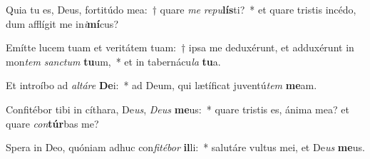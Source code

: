 \item Quia tu es, Deus, fortitúdo mea:~† quare \textit{me} \textit{re}\textit{pu}\textbf{lís}ti?~* et quare tristis incédo, dum afflígit me in\textit{i}\textbf{mí}cus?
\item Emítte lucem tuam et veritátem tuam:~† ipsa me deduxérunt, et adduxérunt in mon\textit{tem} \textit{sanc}\textit{tum} \textbf{tu}um,~* et in tabernácu\textit{la} \textbf{tu}a.
\item Et introíbo ad \textit{al}\textit{tá}\textit{re} \textbf{De}i:~* ad Deum, qui lætíficat juventú\textit{tem} \textbf{me}am.
\item Confitébor tibi in cíthara, De\textit{us}, \textit{De}\textit{us} \textbf{me}us:~* quare tristis es, ánima mea? et quare \textit{con}\textbf{túr}bas me?
\item Spera in Deo, quóniam adhuc con\textit{fi}\textit{té}\textit{bor} \textbf{il}li:~* salutáre vultus mei, et De\textit{us} \textbf{me}us.
